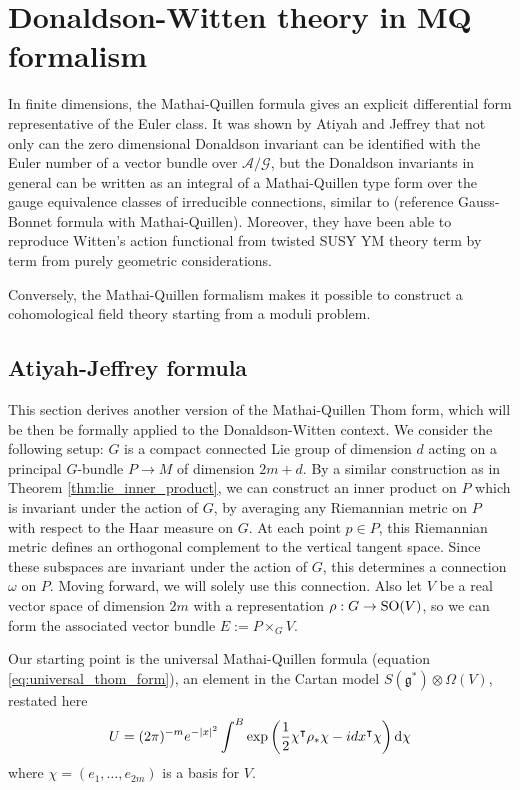 \chapter{Donaldson-Witten theory in MQ formalism}
\label{chapter4}
In finite dimensions, the Mathai-Quillen formula gives an explicit differential
form representative of the Euler class. 
It was shown by Atiyah and
Jeffrey \cite{atiyahlagrangians} that not only can the zero dimensional
Donaldson invariant can be identified with the Euler number of a vector bundle
over $\mathcal{A} /\mathcal{G}$, but the Donaldson invariants in general can be
written as an integral of a Mathai-Quillen type form over the gauge equivalence
classes of irreducible connections, similar to (reference Gauss-Bonnet formula
with Mathai-Quillen).
Moreover, they have been able to reproduce Witten's
action functional from twisted SUSY YM theory term by term from purely geometric
considerations.

Conversely,
the Mathai-Quillen formalism makes it possible to construct a cohomological field
theory starting from a moduli problem.


\section{Atiyah-Jeffrey formula}
This section derives another version of the Mathai-Quillen
Thom form, which will be then be formally applied to the Donaldson-Witten context. 
We consider the following setup: $G$ is a compact connected Lie group
of dimension $d$ acting on a principal $G$-bundle  $P\to M$ of dimension  $2m+d$.
By a similar construction as in Theorem \ref{thm:lie_inner_product}, we can
construct an inner product on $P$ which is invariant under the action of  $G$,
by averaging any Riemannian metric on $P$ with respect to the Haar measure on
$G$. At each point $p\in P$, this Riemannian metric defines an orthogonal
complement to the vertical tangent space. Since these subspaces are invariant
under the action of $G$, this determines a connection  $\omega$ on  $P$.
Moving forward, we will solely use this connection.
Also let $V$ be a real vector space of dimension  $2m$  with a
representation $\rho : G \to \operatorname{SO}(V)$, so we can form the associated
vector bundle $E:= P\times_G V$. 

Our starting point is the universal Mathai-Quillen formula
(equation \ref{eq:universal_thom_form}), an element in the
Cartan model $S(\mathfrak{g}^*)\otimes \Omega(V)$, restated here
\begin{equation} \label{eq:universal_thom_form2}
	U = (2\pi)^{-m}e^{-\abs{x}^2}\int^B
	\exp\paren{\frac{1}{2}\chi^{\intercal}\rho_*\chi - idx^\intercal \chi}
	\odif{\chi}
\end{equation}
where $\chi = (e_1,\ldots,e_{2m})$ is a basis for $V$.

